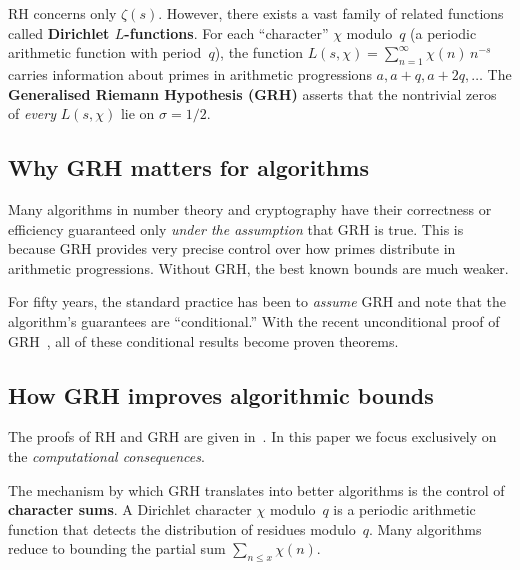 \documentclass[11pt]{article}
\theoremstyle{plain}
\theoremstyle{definition}
\theoremstyle{remark}
\begin{document}
RH concerns only $\zeta(s)$. However, there exists a vast family of
related functions called \textbf{Dirichlet $L$-functions}. For each
``character'' $\chi$ modulo~$q$ (a periodic arithmetic function with
period~$q$), the function $L(s,\chi) = \sum_{n=1}^\infty \chi(n)\,n^{-s}$
carries information about primes in arithmetic progressions
$a, a+q, a+2q, \ldots$ The \textbf{Generalised Riemann Hypothesis (GRH)}
asserts that the nontrivial zeros of \emph{every} $L(s,\chi)$ lie on
$\sigma = 1/2$.

\subsection{Why GRH matters for algorithms}

Many algorithms in number theory and cryptography have their correctness
or efficiency guaranteed only \emph{under the assumption} that GRH is
true. This is because GRH provides very precise control over how primes
distribute in arithmetic progressions. Without GRH, the best known
bounds are much weaker.

For fifty years, the standard practice has been to \emph{assume} GRH
and note that the algorithm's guarantees are ``conditional.'' With the
recent unconditional proof of GRH~\cite{alarcon2026f,alarcon2026c,alarcon2026d},
all of these conditional results become proven theorems.

\subsection{How GRH improves algorithmic bounds}

The proofs of RH and GRH are given
in~\cite{alarcon2026c,alarcon2026d,alarcon2026f}. In this paper
we focus exclusively on the \emph{computational consequences}.

The mechanism by which GRH translates into better algorithms is
the control of \textbf{character sums}. A Dirichlet character
$\chi$ modulo~$q$ is a periodic arithmetic function that detects
the distribution of residues modulo~$q$. Many algorithms reduce
to bounding the partial sum $\sum_{n \leq x} \chi(n)$.
\end{document}
